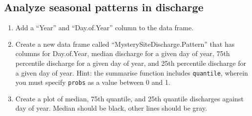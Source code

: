 \documentclass[]{article}
\providecommand{\tightlist}{%
  \setlength{\itemsep}{0pt}\setlength{\parskip}{0pt}}
\begin{document}
\hypertarget{analyze-seasonal-patterns-in-discharge}{%
\subsection{Analyze seasonal patterns in
discharge}\label{analyze-seasonal-patterns-in-discharge}}

\begin{enumerate}
\def\labelenumi{\arabic{enumi}.}
\setcounter{enumi}{4}
\tightlist
\item
  Add a ``Year'' and ``Day.of.Year'' column to the data frame.
\item
  Create a new data frame called ``MysterySiteDischarge.Pattern'' that
  has columns for Day.of.Year, median discharge for a given day of year,
  75th percentile discharge for a given day of year, and 25th percentile
  discharge for a given day of year. Hint: the summarise function
  includes \texttt{quantile}, wherein you must specify \texttt{probs} as
  a value between 0 and 1.
\item
  Create a plot of median, 75th quantile, and 25th quantile discharges
  against day of year. Median should be black, other lines should be
  gray.
\end{enumerate}
\end{document}

